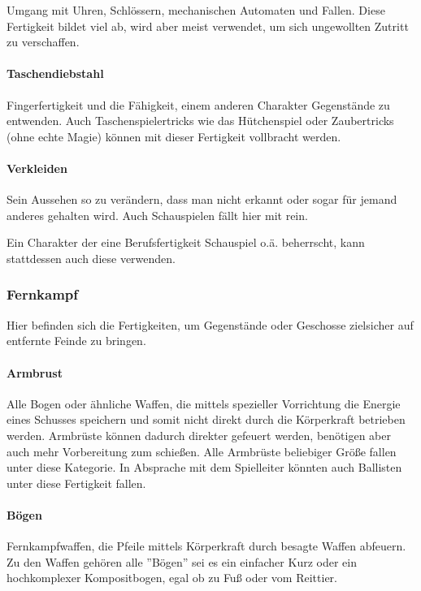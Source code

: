 \documentclass{article}
\begin{document}
Umgang mit Uhren, Schlössern, mechanischen Automaten und Fallen. Diese Fertigkeit bildet viel ab, wird aber meist
verwendet, um sich ungewollten Zutritt zu verschaffen.

\paragraph{Taschendiebstahl}

Fingerfertigkeit und die Fähigkeit, einem anderen Charakter Gegenstände zu entwenden. Auch Taschenspielertricks wie
das Hütchenspiel oder Zaubertricks (ohne echte Magie) können mit dieser Fertigkeit vollbracht werden.

\paragraph{Verkleiden}

Sein Aussehen so zu verändern, dass man nicht erkannt oder sogar für jemand anderes gehalten wird. Auch
Schauspielen fällt hier mit rein.

Ein Charakter der eine Berufsfertigkeit Schauspiel o.ä. beherrscht, kann stattdessen auch diese verwenden.

\subsubsection{Fernkampf}

Hier befinden sich die Fertigkeiten, um Gegenstände oder Geschosse zielsicher auf entfernte Feinde zu bringen.

\paragraph{Armbrust}

Alle Bogen oder ähnliche Waffen, die mittels spezieller Vorrichtung die Energie eines Schusses speichern und
somit nicht direkt durch die Körperkraft betrieben werden. Armbrüste können dadurch direkter gefeuert werden,
benötigen aber auch mehr Vorbereitung zum schießen. Alle Armbrüste beliebiger Größe fallen unter diese Kategorie.
In Absprache mit dem Spielleiter könnten auch Ballisten unter diese Fertigkeit fallen.

\paragraph{Bögen}

Fernkampfwaffen, die Pfeile mittels Körperkraft durch besagte Waffen abfeuern. Zu den Waffen gehören alle ''Bögen'' sei
es ein einfacher Kurz oder ein hochkomplexer Kompositbogen, egal ob zu Fuß oder vom Reittier.
\end{document}
